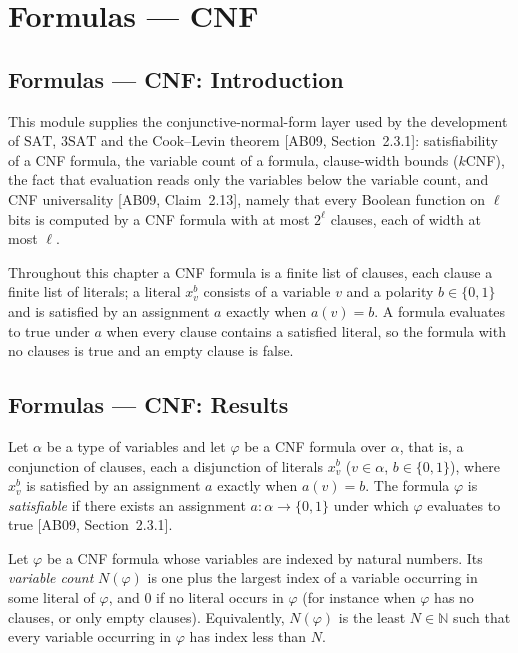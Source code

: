 \section{Formulas --- CNF}
\subsection*{Formulas --- CNF: Introduction}

This module supplies the conjunctive-normal-form layer used by the development of
$\mathrm{SAT}$, $3\mathrm{SAT}$ and the Cook--Levin theorem [AB09, Section~2.3.1]:
satisfiability of a CNF formula, the variable count of a formula, clause-width bounds
($k$CNF), the fact that evaluation reads only the variables below the variable count,
and CNF universality [AB09, Claim~2.13], namely that every Boolean function on $\ell$
bits is computed by a CNF formula with at most $2^\ell$ clauses, each of width at
most $\ell$.

Throughout this chapter a CNF formula is a finite list of clauses, each clause a
finite list of literals; a literal $x_v^b$ consists of a variable $v$ and a polarity
$b \in \{0,1\}$ and is satisfied by an assignment $a$ exactly when $a(v) = b$. A
formula evaluates to true under $a$ when every clause contains a satisfied literal, so
the formula with no clauses is true and an empty clause is false.

\subsection*{Formulas --- CNF: Results}

\begin{definition}
\label{Std.Sat.CNF.Satisfiable}
\leanok
Let $\alpha$ be a type of variables and let $\varphi$ be a CNF formula over $\alpha$,
that is, a conjunction of clauses, each a disjunction of literals $x_v^b$
($v \in \alpha$, $b \in \{0,1\}$), where $x_v^b$ is satisfied by an assignment $a$
exactly when $a(v) = b$. The formula $\varphi$ is \emph{satisfiable} if there exists
an assignment $a : \alpha \to \{0,1\}$ under which $\varphi$ evaluates to true
[AB09, Section~2.3.1].
\end{definition}

\begin{definition}
\label{Std.Sat.CNF.numVars}
\leanok
Let $\varphi$ be a CNF formula whose variables are indexed by natural numbers. Its
\emph{variable count} $N(\varphi)$ is one plus the largest index of a variable
occurring in some literal of $\varphi$, and $0$ if no literal occurs in $\varphi$ (for
instance when $\varphi$ has no clauses, or only empty clauses). Equivalently,
$N(\varphi)$ is the least $N \in \mathbb{N}$ such that every variable occurring in
$\varphi$ has index less than $N$.
\end{definition}


